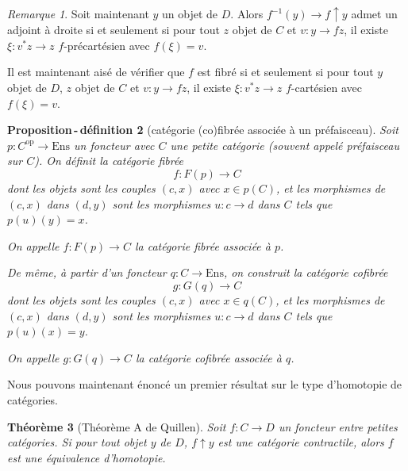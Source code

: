 \documentclass{amsart}
\theoremstyle{plain}
\newtheorem{theo}{Théorème}[section]
\newtheorem{propdefi}[theo]{Proposition\,-\,définition}
\theoremstyle{definition}
\theoremstyle{remark}
\newtheorem{rem}[theo]{Remarque}
\newcommand{\op}{^\mathrm{op}}
\newcommand{\Ens}{\mathrm{Ens}}
\newcommand{\ra}{\rightarrow}
\begin{document}
\begin{rem}
  Soit maintenant $y$ un objet de $D$.
  Alors $f^{-1}(y)\ra f\uparrow y$ admet un adjoint à droite si et seulement si pour tout $z$ objet de $C$ et $v:y\ra fz$,
  il existe $\xi:v^* z\ra z$ $f$-précartésien avec $f(\xi)=v$.

  \begin{center}
  \end{center}

  Il est maintenant aisé de vérifier que $f$ est fibré si et seulement si pour tout $y$ objet de $D$, $z$ objet de $C$ et $v:y\ra fz$,
  il existe $\xi:v^* z\ra z$ $f$-cartésien avec $f(\xi)=v$.
\end{rem}

\begin{propdefi}[catégorie (co)fibrée associée à un préfaisceau]
  Soit $p:C\op\ra\Ens$ un foncteur avec $C$ une petite catégorie (souvent appelé préfaisceau sur $C$). On définit la catégorie fibrée
  $$f:F(p)\ra C$$
  dont les objets sont les couples $(c,x)$ avec $x\in p(C)$, et les morphismes de $(c,x)$ dans $(d,y)$ sont les morphismes
  $u:c\ra d$ dans $C$ tels que $p(u)(y)=x$.

  On appelle $f:F(p)\ra C$ la catégorie fibrée associée à $p$.

  De même, à partir d'un foncteur $q:C\ra \Ens$, on construit la catégorie cofibrée
  $$g:G(q)\ra C$$
  dont les objets sont les couples $(c,x)$ avec $x\in q(C)$, et les morphismes de $(c,x)$ dans $(d,y)$ sont les morphismes
  $u:c\ra d$ dans $C$ tels que $p(u)(x)=y$.

  On appelle $g:G(q)\ra C$ la catégorie cofibrée associée à $q$.
\end{propdefi}

Nous pouvons maintenant énoncé un premier résultat sur le type d'homotopie de catégories.

\begin{theo}[Théorème A de Quillen]\label{theoremeA}
  Soit $f:C\ra D$ un foncteur entre petites catégories. Si pour tout objet $y$ de $D$, $f\uparrow y$ est une catégorie contractile,
  alors $f$ est une équivalence d'homotopie.
\end{theo}
\end{document}

